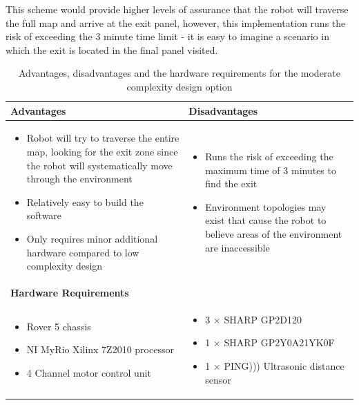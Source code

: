 \documentclass[a4paper]{article}
\begin{document}
This scheme would provide higher levels of assurance that the robot will traverse the full map and arrive at the exit panel, however, this implementation runs the risk of exceeding the 3 minute time limit - it is easy to imagine a scenario in which the exit is located in the final panel visited.

\begin{table}[h]
\centering
\caption{Advantages, disadvantages and the hardware requirements for the moderate complexity design option}
\small\begin{tabular}{p{8cm}p{8cm}}
\toprule
\textbf{Advantages} & \textbf{Disadvantages}\\
\midrule
\begin{itemize}\item Robot will try to traverse the entire map, looking for the exit zone since the robot will systematically move through the environment \item Relatively easy to build the software \item Only requires minor additional hardware compared to low complexity design \end{itemize} &
\begin{itemize}\item Runs the risk of exceeding the maximum time of 3 minutes to find the exit \item Environment topologies may exist that cause the robot to believe areas of the environment are inaccessible \end{itemize}\\
\midrule
\textbf{Hardware Requirements} & \\
\midrule
\begin{itemize}\item Rover 5 chassis \item NI MyRio Xilinx 7Z2010 processor \item 4 Channel motor control unit \end{itemize} & \begin{itemize} \item 3 $\times$ SHARP GP2D120 \item 1 $\times$ SHARP GP2Y0A21YK0F \item 1 $\times$ PING))) Ultrasonic distance sensor \end{itemize}\\
\bottomrule
\end{tabular}
\end{table}
\end{document}
